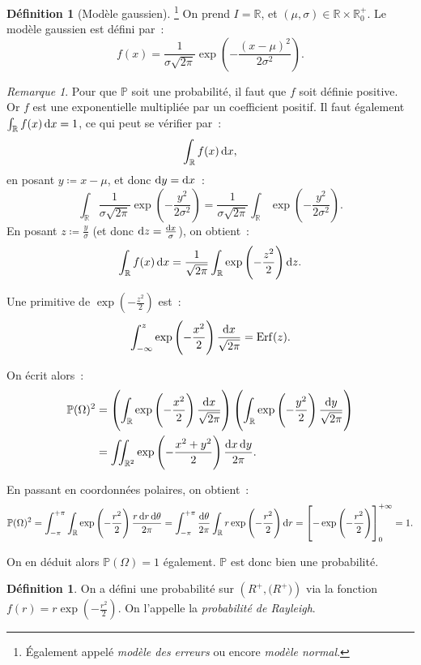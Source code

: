 \documentclass{article}
\renewcommand{\P}{\mathbb P}
\newcommand{\R}{\mathbb R}
\DeclareMathOperator{\Erf}{Erf}
\theoremstyle{definition}
\newtheorem{déf}[thm]{Définition}
\theoremstyle{remark}
\newtheorem*{rmq}{Remarque}
\begin{document}
		\begin{déf}[Modèle gaussien]\footnote{Également appelé \emph{modèle des erreurs} ou encore \textit{modèle normal}.} On prend $I = \R$, et
		$(\mu, \sigma) \in \R \times \R^+_0$. Le modèle gaussien est défini par~:
		\[f(x) = \frac 1{\sigma\sqrt{2\pi}}\exp\left(-\frac {(x-\mu)^2}{2\sigma^2}\right).\]
		\end{déf}

		\begin{rmq} Pour que $\P$ soit une probabilité, il faut que $f$ soit définie positive. Or $f$ est une exponentielle multipliée par un coefficient
		positif. Il faut également $\int_\R f(x)\dif x = 1$, ce qui peut se vérifier par~:
		\[\int_\R f(x)\dif x,\]
		en posant $y \coloneqq x-\mu$, et donc $\dif y = \dif x$~:
		\[\int_\R \frac 1{\sigma \sqrt{2\pi}}\exp\left(-\frac {y^2}{2\sigma^2}\right) = \frac 1{\sigma\sqrt{2\pi}}\int_\R\exp\left(-\frac {y^2}{2\sigma^2}\right).\]
		En posant $z \coloneqq \frac y\sigma$ (et donc $\dif z = \frac {\dif x}\sigma$), on obtient~:
		\[\int_\R f(x)\dif x = \frac 1{\sqrt{2\pi}}\int_\R\exp\left(-\frac {z^2}2\right)\dif z.\]

		Une primitive de $\exp\left(-\frac {z^2}2\right)$ est~:
		\[\int_{-\infty}^z\exp\left(-\frac {x^2}2\right)\frac {\dif x}{\sqrt{2\pi}} = \Erf(z).\]

		On écrit alors~:
		\[\begin{aligned}
			\P(\Omega)^2 &= \left(\int_\R\exp\left(-\frac {x^2}2\right)\frac {\dif x}{\sqrt{2\pi}}\right)
			                \left(\int_\R\exp\left(-\frac {y^2}2\right)\frac {\dif y}{\sqrt{2\pi}}\right) \\
			             &= \iint_{\R^2}\exp\left(-\frac {x^2+y^2}2\right)\frac {\dif x\dif y}{2\pi}.
		\end{aligned}\]
		
		En passant en coordonnées polaires, on obtient~:
		\[\P(\Omega)^2 = \int_{-\pi}^{+\pi}\int_\R\exp\left(-\frac {r^2}2\right)\frac {r\dif r\dif \theta}{2\pi}
		= \int_{-\pi}^{+\pi}\frac {\dif \theta}{2\pi}\int_\R r\exp\left(-\frac {r^2}2\right)\dif r
		= \left[-\exp\left(-\frac {r^2}2\right)\right]_0^{+\infty} = 1.\]

		On en déduit alors $\P(\Omega) = 1$ également. $\P$ est donc bien une probabilité. \end{rmq}
		
		\begin{déf} On a défini une probabilité sur $\left(R^+, \mathcal(R^+)\right)$ via la fonction $f(r) = r\exp\left(-\frac {r^2}2\right)$.
		On l'appelle la \emph{probabilité de Rayleigh}. \end{déf}
\end{document}
